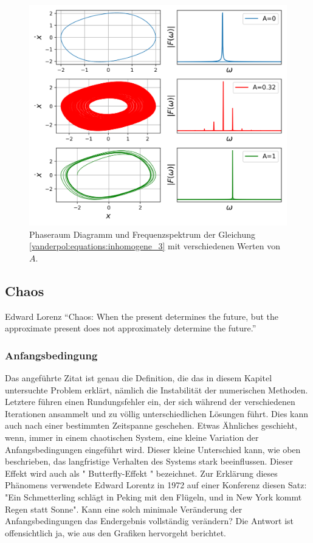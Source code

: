 \begin{figure}[ht]
	\centering
	\includegraphics[width=\textwidth]{papers/vanderpol/figures/fft_plot.png}
	\caption{Phaseraum Diagramm und Frequenzspektrum der Gleichung \ref{vanderpol:equations:inhomogene_3} mit verschiedenen Werten von $A$.\label{vanderpol:figures:fft}}
\end{figure}
\subsection{Chaos}
\label{vanderpol:subsection:chaos}
 
\begin{cquote}[30pt]{Edward Lorenz}
``Chaos: When the present determines the future, but the approximate present does not approximately determine the future.''
\end{cquote}
 
\subsubsection{Anfangsbedingung}
\label{vanderpol:subsubsection:anfangsbedingung}
 
Das angeführte Zitat ist genau die Definition, die das in diesem Kapitel untersuchte Problem erklärt, nämlich die Instabilität der numerischen Methoden. Letztere führen einen Rundungsfehler ein, der sich während der verschiedenen Iterationen ansammelt und zu völlig unterschiedlichen Lösungen führt. Dies kann auch nach einer bestimmten Zeitspanne geschehen.
Etwas Ähnliches geschieht, wenn, immer in einem chaotischen System, eine kleine Variation der Anfangsbedingungen eingeführt wird.  Dieser kleine Unterschied kann, wie oben beschrieben, das langfristige Verhalten des Systems stark beeinflussen. Dieser Effekt wird auch als " Butterfly-Effekt " bezeichnet. Zur Erklärung dieses Phänomens verwendete Edward Lorentz in 1972 auf einer Konferenz diesen Satz: "Ein Schmetterling schlägt in Peking mit den Flügeln, und in New York kommt Regen statt Sonne". Kann eine solch minimale Veränderung der Anfangsbedingungen das Endergebnis vollständig verändern? Die Antwort ist offensichtlich ja, wie aus den Grafiken hervorgeht berichtet.





